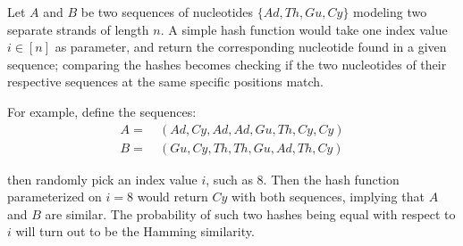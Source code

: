 Let $A$ and $B$ be two sequences of \dna{} nucleotides $\{Ad, Th, Gu, Cy\}$ modeling two separate \dna{} strands of length $n$. A simple hash function would take one index value $i \in [n]$ as parameter, and return the corresponding nucleotide found in a given sequence; comparing the hashes becomes checking if the two nucleotides of their respective \dna{} sequences at the same specific positions match.

For example, define the sequences:
\begin{align*}
    A =&\ (Ad, Cy, Ad, Ad, Gu, Th, Cy, Cy) \\
    B =&\ (Gu, Cy, Th, Th, Gu, Ad, Th, Cy)
\end{align*}

then randomly pick an index value $i$, such as $8$. Then the hash function parameterized on $i = 8$ would return $Cy$ with both sequences, implying that $A$ and $B$ are similar. The probability of such two hashes being equal with respect to $i$ will turn out to be the Hamming similarity.


